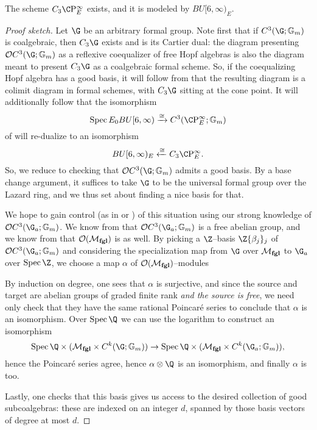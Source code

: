 \begin{theorem}
The scheme $C_3 \CP^\infty_E$ exists, and it is modeled by $BU[6, \infty)_E$.
\end{theorem}
\begin{proof}[Proof sketch]
Let $\G$ be an arbitrary formal group.  Note first that if $C^3(\G; \Gm)$ is coalgebraic, then $C_3 \G$ exists and is its Cartier dual: the diagram presenting $\sheaf OC^3(\G; \Gm)$ as a reflexive coequalizer of free Hopf algebras is also the diagram meant to present $C_3 \G$ as a coalgebraic formal scheme.  So, if the coequalizing Hopf algebra has a good basis, it will follow from  that the resulting diagram is a colimit diagram in formal schemes, with $C_3 \G$ sitting at the cone point.  It will additionally follow that the isomorphism \[\Spec E_0 BU[6, \infty) \xrightarrow{\cong} C^3(\CP^\infty_E; \Gm)\] of  will re-dualize to an isomorphism \[BU[6, \infty)_E \xleftarrow{\cong} C_3 \CP^\infty_E.\]  So, we reduce to checking that $\sheaf O C^3(\G; \Gm)$ admits a good basis.  By a base change argument, it suffices to take $\G$ to be the universal formal group over the Lazard ring, and we thus set about finding a nice basis for that.

We hope to gain control (as in  or ) of this situation using our strong knowledge of $\sheaf O C^3(\G_a; \Gm)$.  We know from  that $\sheaf O C^3(\G_a; \Gm)$ is a free abelian group, and we know from  that $\mathcal{O}(\mathcal{M}_{\mathbf{fgl}})$ is as well.  By picking a $\Z$--basis $\Z\{\beta_j\}_j$ of $\sheaf O C^3(\G_a; \Gm)$ and considering the specialization map from $\G$ over $\mathcal{M}_{\mathbf{fgl}}$ to $\G_a$ over $\Spec \Z$, we choose a map $\alpha$ of $\mathcal{O}(\mathcal{M}_{\mathbf{fgl}})$--modules
\begin{center}
\end{center}
By induction on degree, one sees that $\alpha$ is surjective, and since the source and target are abelian groups of graded finite rank \emph{and the source is free}, we need only check that they have the same rational Poincar\'e series to conclude that $\alpha$ is an isomorphism.  Over $\Spec \Q$ we can use the logarithm to construct an isomorphism \[\Spec \Q \times (\moduli{fgl} \times C^k(\G; \Gm)) \to \Spec \Q \times (\moduli{fgl} \times C^k(\G_a; \Gm)),\] hence the Poincar\'e series agree, hence $\alpha \otimes \Q$ is an isomorphism, and finally $\alpha$ is too.

Lastly, one checks that this basis gives us access to the desired collection of good subcoalgebras: these are indexed on an integer $d$, spanned by those basis vectors of degree at most $d$.
\end{proof}
